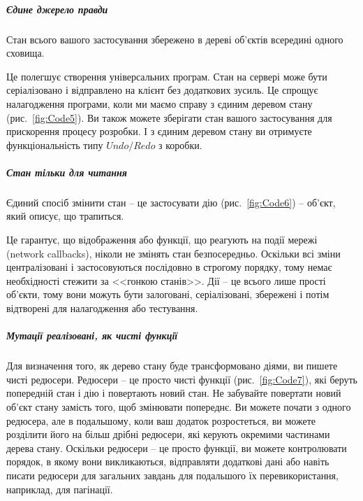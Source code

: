\subparagraph{Єдине джерело правди}

Стан всього вашого застосування збережено в дереві об'єктів всередині одного сховища.

Це полегшує створення універсальних програм. Стан на сервері може бути серіалізовано і відправлено на клієнт без додаткових зусиль. Це спрощує налагодження програми, коли ми маємо справу з єдиним деревом стану (рис.~\ref{fig:Code5}). Ви також можете зберігати стан вашого застосування для прискорення процесу розробки. І з єдиним деревом стану ви отримуєте функціональність типу $Undo / Redo$ з коробки.


\subparagraph{Стан тільки для читання}


Єдиний спосіб змінити стан -- це застосувати дію (рис.~\ref{fig:Code6}) -- об'єкт, який описує, що трапиться. 

Це гарантує, що відображення або функції, що реагують на події мережі (network callbacks), ніколи не змінять стан безпосередньо. Оскільки всі зміни централізовані і застосовуються послідовно в строгому порядку, тому немає необхідності стежити за <<гонкою станів>>. Дії -- це всього лише прості об'єкти, тому вони можуть бути залоговані, серіалізовані, збережені і потім відтворені для налагодження або тестування.

\subparagraph{Мутації реалізовані, як чисті функції}


Для визначення того, як дерево стану буде трансформовано діями, ви пишете чисті редюсери.
Редюсери -- це просто чисті функції (рис.~\ref{fig:Code7}), які беруть попередній стан і дію і повертають новий стан. Не забувайте повертати новий об'єкт стану замість того, щоб змінювати попереднє. Ви можете почати з одного редюсера, але в подальшому, коли ваш додаток розростеться, ви можете розділити його на більш дрібні редюсери, які керують окремими частинами дерева стану. Оскільки редюсери -- це просто функції, ви можете контролювати порядок, в якому вони викликаються, відправляти додаткові дані або навіть писати редюсери для загальних завдань для подальшого їх перевикористання, наприклад, для пагінації.

